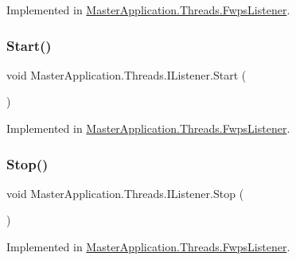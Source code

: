 Implemented in \mbox{\hyperlink{class_master_application_1_1_threads_1_1_fwps_listener_aee12307bd200ca163ed2d536db60b0bc}{Master\+Application.\+Threads.\+Fwps\+Listener}}.

\mbox{\label{interface_master_application_1_1_threads_1_1_i_listener_ae413bfc6d77762470fa78203cd07271b}} 
\subsubsection{\texorpdfstring{Start()}{Start()}}
{\footnotesize\ttfamily void Master\+Application.\+Threads.\+I\+Listener.\+Start (\begin{DoxyParamCaption}{ }\end{DoxyParamCaption})}



Implemented in \mbox{\hyperlink{class_master_application_1_1_threads_1_1_fwps_listener_abb282c4f8d463224c65582c91dd1a5bb}{Master\+Application.\+Threads.\+Fwps\+Listener}}.

\mbox{\label{interface_master_application_1_1_threads_1_1_i_listener_a0d9d8ecd623c0e30648053b64a7fc13a}} 
\subsubsection{\texorpdfstring{Stop()}{Stop()}}
{\footnotesize\ttfamily void Master\+Application.\+Threads.\+I\+Listener.\+Stop (\begin{DoxyParamCaption}{ }\end{DoxyParamCaption})}



Implemented in \mbox{\hyperlink{class_master_application_1_1_threads_1_1_fwps_listener_a590df6f1cf3d72935ba0aa2e26ed6174}{Master\+Application.\+Threads.\+Fwps\+Listener}}.



